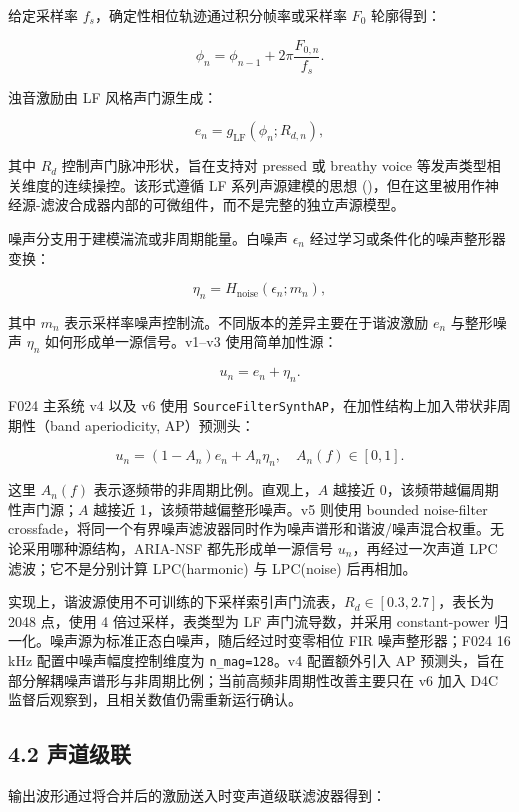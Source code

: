 给定采样率 \(f_s\)，确定性相位轨迹通过积分帧率或采样率 \(F_0\)
轮廓得到：

\[
\phi_n = \phi_{n-1} + 2\pi \frac{F_{0,n}}{f_s}.
\]

浊音激励由 LF 风格声门源生成：

\[
e_n = g_{\mathrm{LF}}(\phi_n; R_{d,n}),
\]

其中 \(R_d\) 控制声门脉冲形状，旨在支持对 pressed 或 breathy voice
等发声类型相关维度的连续操控。该形式遵循 LF 系列声源建模的思想
()，但在这里被用作神经源-滤波合成器内部的可微组件，而不是完整的独立声源模型。

噪声分支用于建模湍流或非周期能量。白噪声 \(\epsilon_n\)
经过学习或条件化的噪声整形器变换：

\[
\eta_n = H_{\mathrm{noise}}(\epsilon_n; m_n),
\]

其中 \(m_n\) 表示采样率噪声控制流。不同版本的差异主要在于谐波激励
\(e_n\) 与整形噪声 \(\eta_n\) 如何形成单一源信号。v1--v3
使用简单加性源：

\[
u_n = e_n + \eta_n.
\]

F024 主系统 v4 以及 v6 使用
\texttt{SourceFilterSynthAP}，在加性结构上加入带状非周期性（band
aperiodicity, AP）预测头：

\[
u_n = (1-A_n)e_n + A_n\eta_n,
\quad A_n(f)\in[0,1].
\]

这里 \(A_n(f)\) 表示逐频带的非周期比例。直观上，\(A\) 越接近
0，该频带越偏周期性声门源；\(A\) 越接近 1，该频带越偏整形噪声。v5 则使用
bounded noise-filter
crossfade，将同一个有界噪声滤波器同时作为噪声谱形和谐波/噪声混合权重。无论采用哪种源结构，ARIA-NSF
都先形成单一源信号 \(u_n\)，再经过一次声道 LPC 滤波；它不是分别计算
LPC(harmonic) 与 LPC(noise) 后再相加。

实现上，谐波源使用不可训练的下采样索引声门流表，\(R_d\in[0.3,2.7]\)，表长为
2048 点，使用 4 倍过采样，表类型为 LF 声门流导数，并采用 constant-power
归一化。噪声源为标准正态白噪声，随后经过时变零相位 FIR 噪声整形器；F024
16 kHz 配置中噪声幅度控制维度为 \texttt{n\_mag=128}。v4 配置额外引入 AP
预测头，旨在部分解耦噪声谱形与非周期比例；当前高频非周期性改善主要只在
v6 加入 D4C 监督后观察到，且相关数值仍需重新运行确认。

\subsection{4.2 声道级联}\label{ux58f0ux9053ux7ea7ux8054}

输出波形通过将合并后的激励送入时变声道级联滤波器得到：

